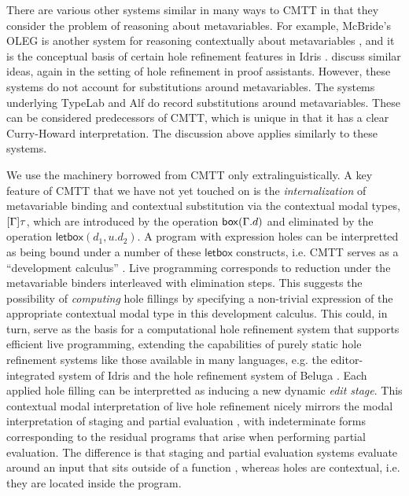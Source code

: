 There are various other systems similar in many ways to CMTT in 
that they consider the problem of reasoning about metavariables. 
For example, McBride's OLEG is another system for reasoning contextually about metavariables
\cite{DBLP:phd/ethos/McBride00}, and it is the conceptual basis of certain hole refinement features in Idris \cite{brady2013idris}. \citet{DBLP:conf/csl/GeuversJ02} discuss similar ideas, again in the setting of hole refinement in proof assistants. However, these systems do not account for substitutions around metavariables. The systems underlying TypeLab \cite{Strecker:98a} and Alf \cite{magnusson1994implementation} do record substitutions around metavariables. These can be considered predecessors of CMTT, which is unique in that it has a clear Curry-Howard interpretation. The discussion above applies similarly to these systems.


We use the machinery 
borrowed from CMTT only extralinguistically.
%
A key feature of CMTT that we have not yet touched on is the
\emph{internalization} of metavariable binding and contextual
substitution via the contextual modal types, $[\Gamma]\tau$, which
are introduced by the operation $\mathsf{box}(\Gamma.d)$ and
eliminated by the operation $\mathsf{letbox}(d_1, u.d_2)$.
%
A program with expression holes can be interpretted as being bound under a number of these $\mathsf{letbox}$ constructs, i.e. CMTT serves as a ``{development calculus}'' \cite{DBLP:phd/ethos/McBride00}. Live programming corresponds to reduction under the metavariable binders interleaved with elimination steps. 
%
This suggests the possibility of \emph{computing} hole fillings by specifying a non-trivial expression of the appropriate contextual 
modal type in this development calculus.
%
This could, in turn, serve as the basis for a computational hole
refinement system that supports efficient live programming, extending the capabilities of purely static hole
refinement systems like those available in many languages,
e.g. the editor-integrated system of Idris
\cite{brady2013idris,Korkut:2018:ETE:3240719.3241791} and the hole refinement system of Beluga
\cite{DBLP:conf/flops/Pientka10,pientka2015inductive}.
%
Each applied hole filling can be interpretted as inducing a new dynamic
\emph{edit stage}.
%
This contextual modal interpretation of live hole refinement
nicely mirrors the modal interpretation of staging and partial evaluation
\cite{Davies:2001op}, with indeterminate forms corresponding to the residual programs that arise when performing partial evaluation. 
%
The difference is that staging and partial evaluation systems evaluate around an input that sits outside of a
function \cite{Jones:1993uq}, whereas holes are contextual, i.e. they are located inside the program. 

